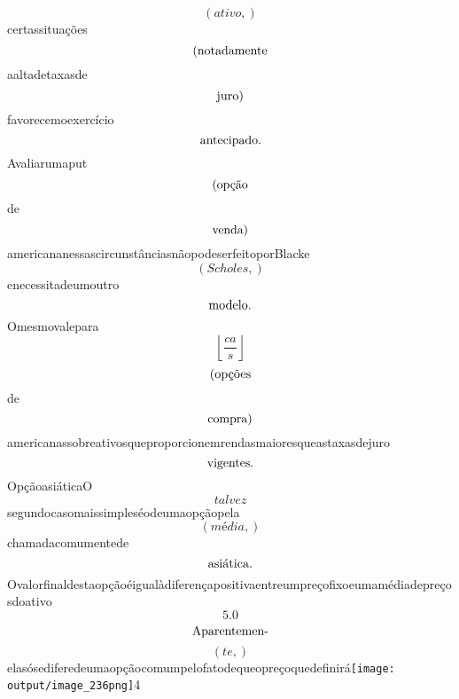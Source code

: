 \documentclass{article}
\begin{document}
\begin{equation}
\left( ativo,\right)
\end{equation}certassituações\begin{equation}
$(notadamente$
\end{equation}aaltadetaxasde\begin{equation}
$juro)$
\end{equation}favorecemoexercício\begin{equation}
$antecipado.$
\end{equation}Avaliarumaput\begin{equation}
$(opção$
\end{equation}de\begin{equation}
$venda)$
\end{equation}americananessascircunstânciasnãopodeserfeitoporBlacke\begin{equation}
\left( Scholes,\right)
\end{equation}enecessitadeumoutro\begin{equation}
$modelo.$
\end{equation}Omesmovalepara\begin{equation}
\left\lfloor{\frac{ca}{s}}\right\rfloor
\end{equation}\begin{equation}
$(opções$
\end{equation}de\begin{equation}
$compra)$
\end{equation}americanassobreativosqueproporcionemrendasmaioresqueastaxasdejuro\begin{equation}
$vigentes.$
\end{equation}OpçãoasiáticaO\begin{equation}
talvez
\end{equation}segundocasomaissimpleséodeumaopçãopela\begin{equation}
\left( média,\right)
\end{equation}chamadacomumentede\begin{equation}
$asiática.$
\end{equation}Ovalorfinaldestaopçãoéigualàdiferençapositivaentreumpreçofixoeumamédiadepreçosdoativo\begin{equation}
5.0
\end{equation}\begin{equation}
$Aparentemen-$
\end{equation}\begin{equation}
\left( te,\right)
\end{equation}elasósediferedeumaopçãocomumpelofatodequeopreçoquedefinirá\texttt{[image: output/image\_236png]}4\begin{equation}

\end{equation}
\end{document}

